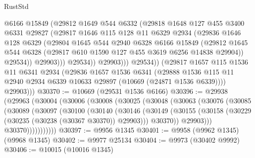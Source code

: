 \begin{lexlean}{RustStd}
\begin{coremodule}
                      @6166
                      @15849
                      (@29812
                        @1649
                        @544
                        @6332
                        (@29818
                          @1648
                          @127
                          @455
                          @3400
                          @6331
                          @29827
                          (@29817
                            @1646
                            @115
                            @128
                            @11
                            @6329
                            @2934
                            (@29836
                              @1646
                              @128
                              @6329
                              (@29804
                                @1645
                                @544
                                @2940
                                @6328
                                @6166
                                @15849
                                (@29812
                                  @1645
                                  @544
                                  @6328
                                  (@29817 @610 @1590 @127 @455 @3619 @6256 @14838 @29904))
                                @29534))
                            @29903)))
                      @29534))
                  @29903)))
            @29534))
        (@29817
          @1657
          @115
          @1536
          @11
          @6341
          @2934
          (@29836
            @1657
            @1536
            @6341
            (@29888 @1536 @115 @11 @2940 @2934 @6339 @10633 @29897 (@10669 (@24871 @1536 @6339))))
          @29903)))
@30370 := @10669 (@29531 @1536 @6166)
@30396 := @29938
    (@29963
      (@30004
        (@30006
          (@30008
            (@30025
              (@30048
                (@30063
                  (@30076
                    (@30085
                      (@30089
                        (@30097
                          (@30100
                            (@30140
                              (@30146
                                (@30149
                                  (@30155
                                    (@30158 (@30229 (@30235 (@30238 (@30367 @30370)) @29903)))
                                    @30370))
                                @29903)))
                          @30370)))))))))))
@30397 := @9956 @1345
@30401 := @9958 (@9962 @1345) (@9968 @1345)
@30402 := @9977 @25134
@30404 := @9973 (@30402 @9992)
@30406 := @10015 (@10016 @1345)

\end{coremodule}
\end{lexlean}
